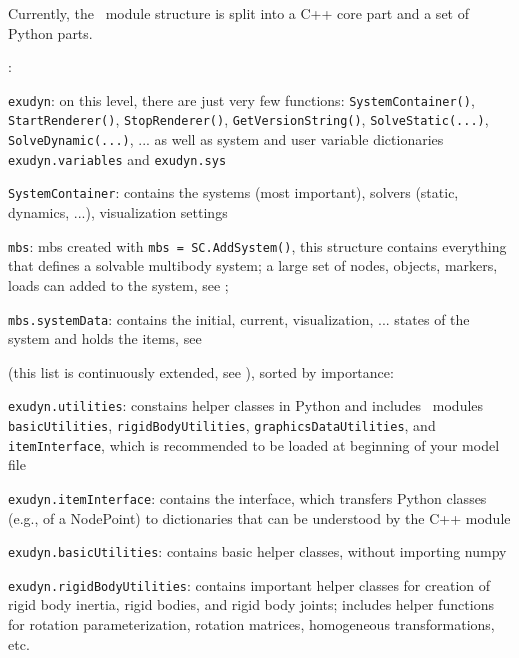 Currently, the \codeName\ module structure is split into a C++ core part and a set of 
Python parts.
\bi
  \item {}:
  \bi
    \item[--] \texttt{exudyn}:
    on this level, there are just very few functions: \texttt{SystemContainer()}, \texttt{StartRenderer()}, \texttt{StopRenderer()}, \texttt{GetVersionString()}, \texttt{SolveStatic(...)}, \texttt{SolveDynamic(...)}, ... as well as system and user variable dictionaries \texttt{exudyn.variables} and \texttt{exudyn.sys}
    \item[--] \texttt{SystemContainer}: contains the systems (most important), solvers (static, dynamics, ...), visualization settings
    \item[--] \texttt{mbs}: \acf{mbs} created with \texttt{mbs = SC.AddSystem()}, this structure contains everything that defines a solvable multibody system; a large set of nodes, objects, markers, 
    loads can added to the system, see ;
    \item[--] \texttt{mbs.systemData}: contains the initial, current, visualization, ... states of the system and holds the items, see 
  \ei
  \item {} (this list is continuously extended, see ), sorted by importance:
  \bi
    \item[--] \texttt{exudyn.utilities}: constains helper classes in Python and includes \codeName\ modules \texttt{basicUtilities}, \texttt{rigidBodyUtilities}, \texttt{graphicsDataUtilities}, and \texttt{itemInterface}, which is recommended to be loaded at beginning of your model file
    \item[--] \texttt{exudyn.itemInterface}: contains the interface, which transfers Python classes (e.g., of a NodePoint) to dictionaries that can be understood by the C++ module
    \item[--] \texttt{exudyn.basicUtilities}: contains basic helper classes, without importing numpy
    \item[--] \texttt{exudyn.rigidBodyUtilities}: contains important helper classes for creation of rigid body inertia, rigid bodies, and rigid body joints; includes helper functions for rotation parameterization, rotation matrices, homogeneous transformations, etc.
